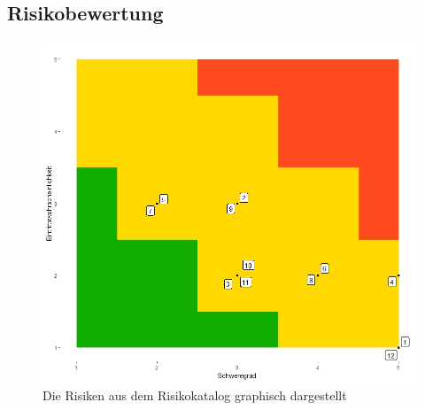 \documentclass[a4paper]{report}
\begin{document}
\subsection{Risikobewertung}
\label{sec:RisikoBewertung}
\begin{figure}[h!]
	\centering
	\includegraphics[width=.6\textwidth,keepaspectratio]{Risikomatrix}
	\caption{Die Risiken aus dem Risikokatalog graphisch dargestellt}
	\label{fig:Risikomatrix}
\end{figure}
\end{document}
